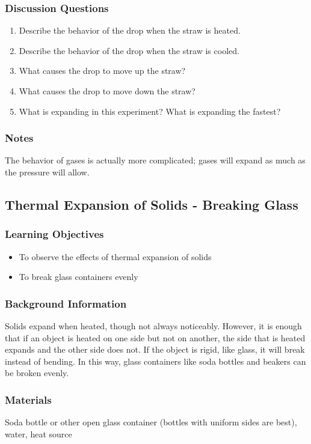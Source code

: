 \subsubsection*{Discussion Questions}
\begin{enumerate}
\item{Describe the behavior of the drop when the straw is heated.} 
\item{Describe the behavior of the drop when the straw is cooled.} 
\item{What causes the drop to move up the straw?}
\item{What causes the drop to move down the straw?}
\item{What is expanding in this experiment? What is expanding the fastest?}
\end{enumerate}

\subsubsection*{Notes}
The behavior of gases is actually more complicated; gases will expand as much as the pressure will allow.

\subsection{Thermal Expansion of Solids - Breaking Glass}

\subsubsection*{Learning Objectives}
\begin{itemize}
\item{To observe the effects of thermal expansion of solids}
\item{To break glass containers evenly}
\end{itemize}

\subsubsection*{Background Information}
Solids expand when heated, though not always noticeably.  However, it is enough that if an object is heated on one side but not on another, the side that is heated expands and the other side does not.  If the object is rigid, like glass, it will break instead of bending.  In this way, glass containers like soda bottles and beakers can be broken evenly.

\subsubsection*{Materials}
Soda bottle or other open glass container (bottles with uniform sides are best), water, heat source

